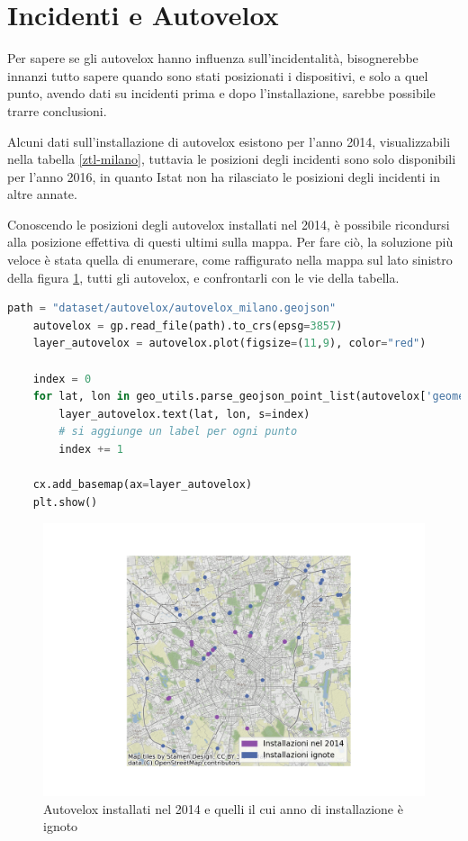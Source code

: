 \documentclass[a4paper]{report}
\begin{document}
\section{Incidenti e Autovelox}

Per sapere se gli autovelox hanno influenza sull'incidentalità, 
bisognerebbe innanzi tutto sapere quando sono stati posizionati i dispositivi, e solo a quel punto, 
avendo dati su incidenti prima e dopo l'installazione, sarebbe possibile trarre conclusioni.

Alcuni dati sull'installazione di autovelox esistono per l'anno 2014, visualizzabili nella 
tabella \ref{ztl-milano}, tuttavia le posizioni degli incidenti 
sono solo disponibili per l'anno 2016, in quanto Istat non ha rilasciato 
le posizioni degli incidenti in altre annate.

Conoscendo le posizioni degli autovelox installati nel 2014, è possibile ricondursi alla 
posizione effettiva di questi ultimi sulla mappa.
Per fare ciò, la soluzione più veloce è stata quella di enumerare, 
come raffigurato nella mappa sul lato sinistro della figura \ref{fig:autovelox-indici}, 
tutti gli autovelox, e confrontarli con le vie della tabella.

\begin{lstlisting}[language=Python]
    path = "dataset/autovelox/autovelox_milano.geojson"
    autovelox = gp.read_file(path).to_crs(epsg=3857)
    layer_autovelox = autovelox.plot(figsize=(11,9), color="red")
    
    index = 0
    for lat, lon in geo_utils.parse_geojson_point_list(autovelox['geometry'].astype(str)):
        layer_autovelox.text(lat, lon, s=index)
        # si aggiunge un label per ogni punto
        index += 1
    
    cx.add_basemap(ax=layer_autovelox)
    plt.show()
\end{lstlisting}

\begin{figure}
    \includegraphics[width=\linewidth]{../src/autovelox/autovelox_2014.png}
    \caption{Autovelox installati nel 2014 e quelli il cui anno di installazione è ignoto}
    \label{fig:autovelox-indici}
\end{figure}
\end{document}
